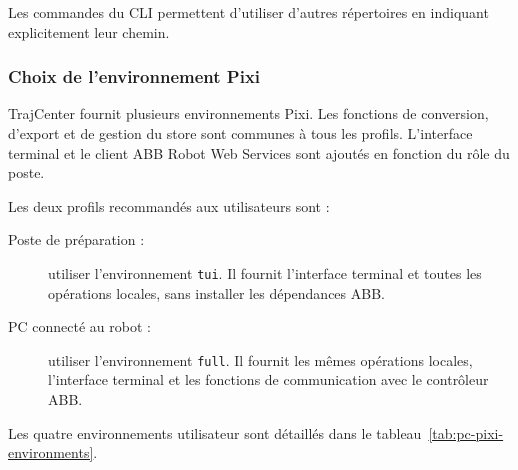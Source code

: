 \documentclass{rapportENSAM}
\begin{document}
Les commandes du CLI permettent d'utiliser d'autres répertoires en indiquant
explicitement leur chemin.


\subsubsection{Choix de l'environnement Pixi}
\label{subsubsec:pc-pixi-environments}

TrajCenter fournit plusieurs environnements Pixi. Les fonctions de
conversion, d'export et de gestion du store sont communes à tous les profils.
L'interface terminal et le client ABB Robot Web Services sont ajoutés en
fonction du rôle du poste.

Les deux profils recommandés aux utilisateurs sont :

\begin{description}
    \item[Poste de préparation :] utiliser l'environnement \texttt{tui}. Il
    fournit l'interface terminal et toutes les opérations locales, sans
    installer les dépendances ABB.

    \item[PC connecté au robot :] utiliser l'environnement \texttt{full}. Il
    fournit les mêmes opérations locales, l'interface terminal et les
    fonctions de communication avec le contrôleur ABB.
\end{description}

Les quatre environnements utilisateur sont détaillés dans le
tableau~\ref{tab:pc-pixi-environments}.
\end{document}
